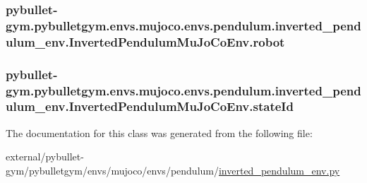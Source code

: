 \subsubsection[{\texorpdfstring{robot}{robot}}]{\setlength{\rightskip}{0pt plus 5cm}pybullet-\/gym.\+pybulletgym.\+envs.\+mujoco.\+envs.\+pendulum.\+inverted\+\_\+pendulum\+\_\+env.\+Inverted\+Pendulum\+Mu\+Jo\+Co\+Env.\+robot}\hypertarget{classpybullet-gym_1_1pybulletgym_1_1envs_1_1mujoco_1_1envs_1_1pendulum_1_1inverted__pendulum__ene24fa0fbd77b386874ccd6320d672258_ae8accc59338d53168049215bbe04a1a7}{}\label{classpybullet-gym_1_1pybulletgym_1_1envs_1_1mujoco_1_1envs_1_1pendulum_1_1inverted__pendulum__ene24fa0fbd77b386874ccd6320d672258_ae8accc59338d53168049215bbe04a1a7}
\subsubsection[{\texorpdfstring{state\+Id}{stateId}}]{\setlength{\rightskip}{0pt plus 5cm}pybullet-\/gym.\+pybulletgym.\+envs.\+mujoco.\+envs.\+pendulum.\+inverted\+\_\+pendulum\+\_\+env.\+Inverted\+Pendulum\+Mu\+Jo\+Co\+Env.\+state\+Id}\hypertarget{classpybullet-gym_1_1pybulletgym_1_1envs_1_1mujoco_1_1envs_1_1pendulum_1_1inverted__pendulum__ene24fa0fbd77b386874ccd6320d672258_aaf8a887a580a4851feef67701799fded}{}\label{classpybullet-gym_1_1pybulletgym_1_1envs_1_1mujoco_1_1envs_1_1pendulum_1_1inverted__pendulum__ene24fa0fbd77b386874ccd6320d672258_aaf8a887a580a4851feef67701799fded}


The documentation for this class was generated from the following file\+:\begin{DoxyCompactItemize}
\item 
external/pybullet-\/gym/pybulletgym/envs/mujoco/envs/pendulum/\hyperlink{mujoco_2envs_2pendulum_2inverted__pendulum__env_8py}{inverted\+\_\+pendulum\+\_\+env.\+py}\end{DoxyCompactItemize}
